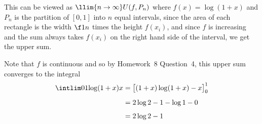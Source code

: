 \documentclass[a4paper]{article}
\begin{document}
This can be viewed as $\llim{n \to \infty} U(f, P_n)$ where $f(x) = \log(1 + x)$ and $P_n$ is the partition of $[0,1]$ into $n$ equal intervals, since the area of each rectangle is the width $\f1n$ times the height $f(x_i)$, and since $f$ is increasing and the sum always takes $f(x_i)$ on the right hand side of the interval, we get the upper sum.


Note that $f$ is continuous and so by Homework~8 Question~4, this upper sum converges to the integral \begin{align*}
\intlim 01 {\log(1 + x)} x &= \big[ (1+x) \log (1+x) - x \big]_0^1\\[1ex]
&= 2 \log 2 - 1 - \log 1 - 0\\[1ex]
&= 2 \log 2 - 1 %
\end{align*}

\end{document}
